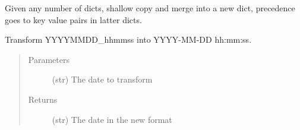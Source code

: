 \documentclass[a4paper,10pt,english]{sphinxmanual}
\begin{document}

\begin{fulllineitems}
\label{\detokenize{apidoc_src/src:src.utilsSat.magenta}}
\end{fulllineitems}


\begin{fulllineitems}
\label{\detokenize{apidoc_src/src:src.utilsSat.merge_dicts}}
Given any number of dicts, shallow copy and merge into a new dict,
precedence goes to key value pairs in latter dicts.

\end{fulllineitems}


\begin{fulllineitems}
\label{\detokenize{apidoc_src/src:src.utilsSat.normal}}
\end{fulllineitems}


\begin{fulllineitems}
\label{\detokenize{apidoc_src/src:src.utilsSat.only_numbers}}
\end{fulllineitems}


\begin{fulllineitems}
\label{\detokenize{apidoc_src/src:src.utilsSat.parse_date}}
Transform YYYYMMDD\_hhmmss into YYYY-MM-DD hh:mm:ss.
\begin{quote}\begin{description}
\item[{Parameters}] \leavevmode
{} \textendash{} (str) The date to transform

\item[{Returns}] \leavevmode
(str) The date in the new format

\end{description}\end{quote}

\end{fulllineitems}
\end{document}
